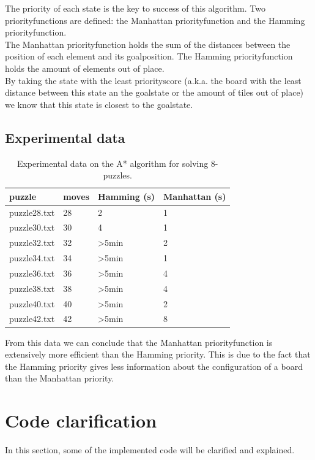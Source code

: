 \documentclass[12pt,a4paper,oneside]{article}
\begin{document}
The priority of each state is the key to success of this algorithm. Two priorityfunctions are defined: the Manhattan priorityfunction and the Hamming priorityfunction.\\
The Manhattan priorityfunction holds the sum of the distances between the position of each element and its goalposition. The Hamming priorityfunction holds the amount of elements out of place\cite{princetonPuzzle}.\\

By taking the state with the least priorityscore (a.k.a. the board with the least distance between this state an the goalstate or the amount of tiles out of place) we know that this state is closest to the goalstate.
\subsection{Experimental data}\label{sec:expData}
\begin{table}[H]
\centering
\begin{tabular}{ l | l | l | l }
	puzzle & moves & Hamming (s) & Manhattan (s) \\ \hline
	puzzle28.txt & 28 & 2 & 1  \\
	puzzle30.txt & 30 & 4 & 1  \\
	puzzle32.txt & 32 & \textgreater 5min & 2 \\
	puzzle34.txt & 34 & \textgreater 5min & 1 \\
	puzzle36.txt & 36 & \textgreater 5min & 4 \\
	puzzle38.txt & 38 & \textgreater 5min & 4 \\
	puzzle40.txt & 40 & \textgreater 5min & 2 \\
	puzzle42.txt & 42 & \textgreater 5min & 8 \\ \hline	
\end{tabular}
	\caption{Experimental data on the A* algorithm for solving 8-puzzles.}
	\label{tab:expData}
\end{table}

From this data we can conclude that the Manhattan priorityfunction is extensively more efficient than the Hamming priority. This is due to the fact that the Hamming priority gives less information about the configuration of a board than the Manhattan priority.
\newpage
\section{Code clarification}\label{sec:CoClar}
In this section, some of the implemented code will be clarified and explained.\\
\end{document}
